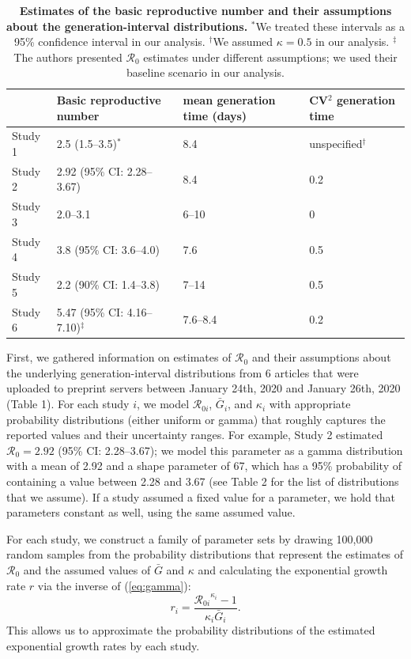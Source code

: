 \documentclass[12pt]{article}
\newcommand{\eref}[1]{(\ref{eq:#1})}
\begin{document}
\begin{table}[t]
\begin{center}
\footnotesize
\begin{tabular}{l|l|l|l}
 & Basic reproductive number & mean generation time (days) & CV$^2$ generation time \\
\hline
Study 1 & 2.5 (1.5--3.5)$^\ast$ & 8.4 & unspecified$^\dagger$ \\
\hline
Study 2 & 2.92 (95\% CI: 2.28--3.67) & 8.4 & 0.2 \\
\hline
Study 3 & 2.0--3.1 & 6--10 & 0 \\
\hline
Study 4 & 3.8 (95\% CI: 3.6--4.0) & 7.6 & 0.5 \\
\hline
Study 5 & 2.2 (90\% CI: 1.4--3.8) & 7--14 & 0.5\\
\hline
Study 6 & 5.47 (95\% CI: 4.16--7.10)$^\ddagger$ & 7.6--8.4 & 0.2
\end{tabular}
\end{center}
\caption{
\textbf{Estimates of the basic reproductive number and their assumptions about the generation-interval distributions.}
$^\ast$We treated these intervals as a 95\% confidence interval in our analysis.
$^\dagger$We assumed $\kappa = 0.5$ in our analysis.
$^\ddagger$The authors presented $\mathcal R_0$ estimates under different assumptions; we used their baseline scenario in our analysis.
}
\end{table}

First, we gathered information on estimates of $\mathcal R_0$ and their
assumptions about the underlying generation-interval distributions from
6 articles that were uploaded to
preprint servers between January 24th, 2020 and January 26th, 2020 (Table 1).
For each study $i$, we model $\mathcal R_{0i}$, $\bar G_i$, and $\kappa_i$ with appropriate probability distributions (either uniform or gamma) that roughly captures the reported values and their uncertainty ranges.
For example, Study 2 estimated $\mathcal R_0 = 2.92$ (95\% CI: 2.28--3.67);
we model this parameter as a gamma distribution with a mean of 2.92 and a shape parameter of 67, which has a 95\% probability of containing a value between 2.28 and 3.67 (see Table 2 for the list of distributions that we assume).
If a study assumed a fixed value for a parameter, we hold that parameters constant as well, using the same assumed value.

For each study, we construct a family of parameter sets by drawing 100,000 random samples from the probability distributions that represent the estimates of $\mathcal R_0$ and the assumed values of $\bar G$ and $\kappa$
and calculating the exponential growth rate $r$ via the inverse of \eref{gamma}:
\begin{equation}
r_i = \frac{{\mathcal R_{0i}}^{\kappa_i} - 1}{\kappa_i \bar{G}_i}.
\end{equation}
This allows us to approximate the probability distributions of the estimated exponential growth rates by each study.
\end{document}
